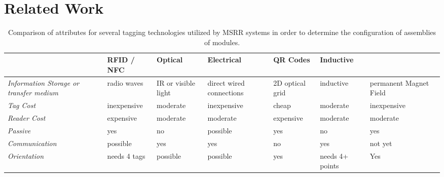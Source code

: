 
\section{Related Work}
\label{sec:RelatedWork}

\begin{table*}[h]
	\centering
	\caption{Comparison of attributes for several tagging technologies utilized by MSRR systems in order to determine the configuration of assemblies of modules.}
	\newcommand{\wdd}{2.0cm}
	\begin{tabular}{ p{2.4 cm} p{\wdd}  p{\wdd} p{\wdd} p{\wdd} p{\wdd} p{\wdd} p{\wdd}  }
		\hline
		\addlinespace[1ex]
																				& RFID / NFC		& Optical				& Electrical 					& QR Codes 			& Inductive				& \bf{\tagNamePlural} 		\\ %
		\hline
		
		\addlinespace[0.5ex]	\textit{Information Storage or transfer medium}	& radio waves		& IR or visible light	& direct wired connections		& 2D optical grid	& inductive				& permanent Magnet Field	\\
		
		\addlinespace[0.5ex]	\textit{Tag Cost}								& inexpensive		& moderate				& inexpensive					& cheap	 			& moderate				& inexpensive 				\\
		
		\addlinespace[0.5ex]	\textit{Reader Cost}							& expensive			& moderate				& moderate						& expensive 	 	& moderate				& moderate 					\\
		
		
		\addlinespace[0.5ex]	\textit{Passive} 								& yes				& no					& possible	 					& yes				& no					& yes		  				\\
		
		\addlinespace[0.5ex]	\textit{Communication} 							& possible			& yes					& yes	 						& no				& yes					& not yet		  			\\
		
		\addlinespace[0.5ex] 	\textit{Orientation} 							& needs 4 tags 		& possible 				& possible	 					& yes				& needs 4+ points		& Yes						\\
		

\end{tabular}
\end{table*}
